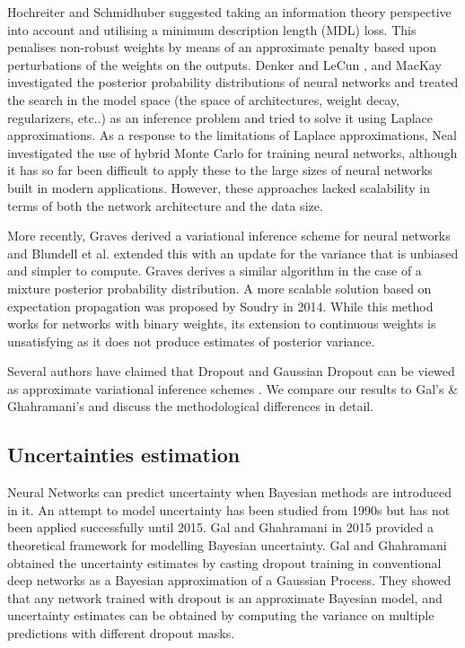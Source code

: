 Hochreiter and Schmidhuber \cite{hochreiter1995simplifying} suggested taking an information theory perspective into account and utilising a minimum description length (MDL) loss. This penalises non-robust weights by means of an approximate penalty based upon perturbations of the weights on the outputs.
Denker and LeCun \cite{denker1991transforming}, and MacKay \cite{mackay1995probable} investigated the posterior probability distributions of neural networks and treated the search in the model space (the space of architectures, weight decay, regularizers, etc..) as an inference problem and tried to solve it using Laplace approximations.
As a response to the limitations of Laplace approximations, Neal \cite{neal2012bayesian} investigated the use of hybrid Monte Carlo for training neural networks, although it has so far been difficult to apply these to the large sizes of neural networks built in modern applications. 
However, these approaches lacked scalability in terms of both the network architecture and the data size. 


More recently, Graves \cite{graves2011practical} derived a variational inference scheme for neural networks and Blundell et al. \cite{blundell2015weight} extended this with an update for the variance that is unbiased and simpler to compute. Graves \cite{graves2016stochastic} derives a similar algorithm in the case of a mixture posterior probability distribution. 
A more scalable solution based on expectation propagation was proposed by Soudry \cite{Soudry:NIPS2014_5269} in 2014. While this method works for networks with binary weights, its extension to continuous weights is unsatisfying as it does not produce estimates of posterior variance.

\newline Several authors have claimed that Dropout \cite{srivastava2014dropout} and Gaussian Dropout \cite{wang2013fast} can be viewed as approximate variational inference schemes \cite{gal2015bayesian, kingma2015variational}. We compare our results to Gal's \& Ghahramani's \cite{gal2015bayesian} and discuss the methodological differences in detail.


\subsection{Uncertainties estimation}

Neural Networks can predict uncertainty when Bayesian methods are introduced in it. An attempt to model uncertainty has been studied from 1990s \cite{neal2012bayesian} but has not been applied successfully until 2015. Gal and Ghahramani \cite{Gal2015Dropout} in 2015 provided a theoretical framework for modelling Bayesian uncertainty. Gal and Ghahramani \cite{gal2015bayesian} obtained the uncertainty estimates by casting dropout training in conventional deep networks as a Bayesian approximation of a Gaussian Process. They showed that any network trained with dropout is an approximate Bayesian model, and uncertainty estimates can be obtained by computing the variance on multiple predictions with different dropout masks.

